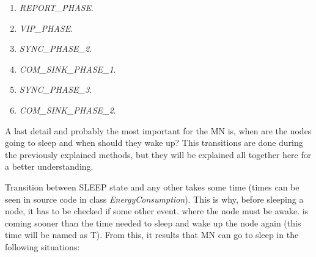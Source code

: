 \begin{itemize}
\begin{itemize}
\begin{enumerate}
    \item \textit{REPORT\_PHASE}.
    \item \textit{VIP\_PHASE}.
    \item \textit{SYNC\_PHASE\_2}.
    \item \textit{COM\_SINK\_PHASE\_1}.
    \item \textit{SYNC\_PHASE\_3}.
    \item \textit{COM\_SINK\_PHASE\_2}.

  \end{enumerate}


 \end{itemize}



\end{itemize}

A last detail and probably the most important for the \ac{MN} is, when are the nodes going to sleep and when should they wake up? This transitions
are done during the previously explained methods, but they will be explained all together here for a better understanding.

Transition between SLEEP state and any other takes some time (times can be seen in source code in class \textit{EnergyConsumption}). This is why,
before sleeping a node, it has to be checked if some other event. where the node must be awake. is coming sooner than the time needed to sleep and
wake up the node again (this time will be named as T). From this, it results that \ac{MN} can go to sleep in the following situations:

